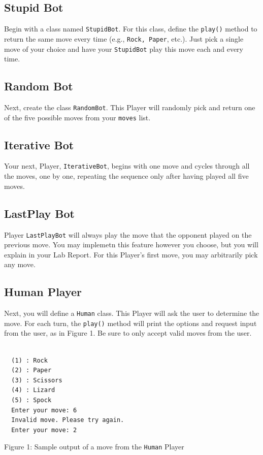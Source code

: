 \documentclass{article}
\begin{document}
\subsection*{Stupid Bot}
Begin with a class named \verb|StupidBot|. For this class, define the \verb|play()| method to return the same move every time (e.g., \verb|Rock, Paper|, etc.). Just pick a single move of your choice and have your \verb|StupidBot| play this move each and every time.

\subsection*{Random Bot}
Next, create the class \verb|RandomBot|. This Player will randomly pick and return one of the five possible moves from your \verb|moves| list.

\subsection*{Iterative Bot}
Your next, Player, \verb|IterativeBot|, begins with one move and cycles through all the moves, one by one, repeating the sequence only after having played all five moves.

\subsection*{LastPlay Bot}
Player \verb|LastPlayBot| will always play the move that the opponent played on the previous move. You may implemetn this feature however you choose, but you will explain in your Lab Report. For this Player's first move, you may arbitrarily pick any move.

\subsection*{Human Player}
Next, you will define a \verb|Human| class. This Player will ask the user to determine the move. For each turn, the \verb|play()| method will print the options and request input from the user, as in Figure 1. Be sure to only accept valid moves from the user.
\\\\
\begin{tcolorbox}
 \begin{verbatim}
  (1) : Rock
  (2) : Paper
  (3) : Scissors
  (4) : Lizard
  (5) : Spock
  Enter your move: 6
  Invalid move. Please try again.
  Enter your move: 2
 \end{verbatim}
 \begin{center}
  Figure 1: Sample output of a move from the \verb|Human| Player
 \end{center}
\end{tcolorbox}
\end{document}
